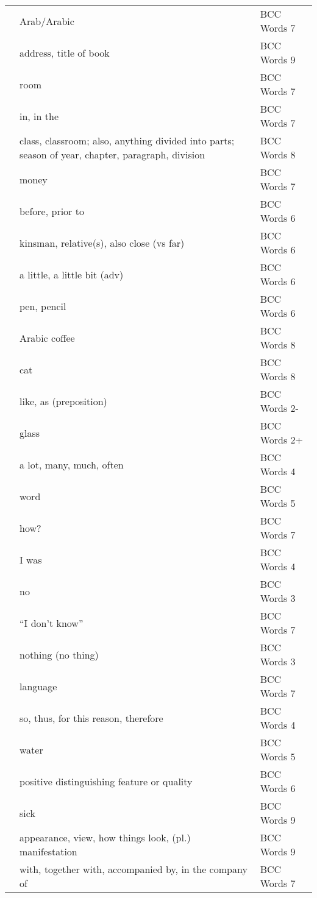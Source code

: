 \documentclass[10pt,twocolumn]{article}
\begin{document}
\begin{xtabular*}{\linewidth}{p{0.1\textwidth}p{0.2\textwidth}>{\footnotesize}p{0.2\textwidth}}
 & Arab/Arabic & BCC Words 7 \\
 & address, title of book & BCC Words 9 \\
 & room & BCC Words 7 \\
 & in, in the & BCC Words 7 \\
 & class, classroom; also, anything divided into parts; season of year, chapter, paragraph, division & BCC Words 8 \\
 & money & BCC Words 7 \\
 & before, prior to & BCC Words 6 \\
 & kinsman, relative(s), also close (vs far) & BCC Words 6 \\
 & a little, a little bit (adv) & BCC Words 6 \\
 & pen, pencil & BCC Words 6 \\
 & Arabic coffee & BCC Words 8 \\
 & cat & BCC Words 8 \\
 & like, as (preposition) & BCC Words 2- \\
 & glass & BCC Words 2+ \\
 & a lot, many, much, often & BCC Words 4 \\
 & word & BCC Words 5 \\
 & how? & BCC Words 7 \\
 & I was & BCC Words 4 \\
 & no & BCC Words 3 \\
 & ``I don't know'' & BCC Words 7 \\
 & nothing (no thing) & BCC Words 3 \\
 & language & BCC Words 7 \\
 & so, thus, for this reason, therefore & BCC Words 4 \\
 & water & BCC Words 5 \\
 & positive distinguishing feature or quality & BCC Words 6 \\
 & sick & BCC Words 9 \\
 & appearance, view, how things look, (pl.) manifestation & BCC Words 9 \\
 & with, together with, accompanied by, in the company of & BCC Words 7 \\

\end{xtabular*}
\end{document}
